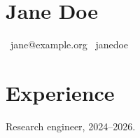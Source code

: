 \documentclass{mycv}
\begin{document}
\section*{Jane Doe}
\faEnvelope\ jane@example.org \quad \faGithub\ janedoe
\section*{Experience}
Research engineer, 2024--2026.
\end{document}
